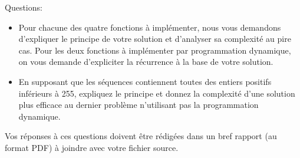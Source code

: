 \documentclass[a4paper,10pt]{article}
\begin{document}
Questions:
\begin{itemize}
\item Pour chacune des quatre fonctions à implémenter, nous vous demandons
d'expliquer le principe de votre solution et d'analyser sa complexité
au pire cas. Pour les deux fonctions à implémenter par programmation
dynamique, on vous demande d'expliciter la récurrence à la
base de votre solution.
\item En supposant que les séquences contiennent toutes des entiers
  positifs inférieurs à 255, expliquez le principe et donnez la
  complexité d'une solution plus efficace au dernier problème
  n'utilisant pas la programmation dynamique.
\end{itemize}

Vos réponses à ces questions doivent être rédigées dans un bref rapport (au format
PDF) à joindre avec votre fichier source.
\end{document}
